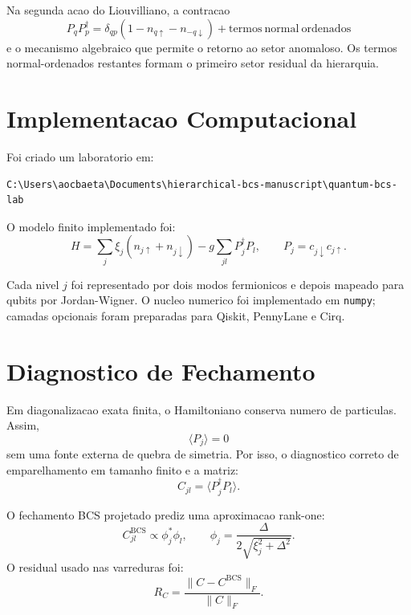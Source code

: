 \documentclass[11pt,a4paper]{article}
\begin{document}
Na segunda acao do Liouvilliano, a contracao
\begin{equation}
P_qP_p^\dagger
=\delta_{qp}(1-n_{q\uparrow}-n_{-q\downarrow})
+\mathrm{termos\ normal\ ordenados}
\end{equation}
e o mecanismo algebraico que permite o retorno ao setor anomaloso. Os termos normal-ordenados restantes formam o primeiro setor residual da hierarquia.

\section{Implementacao Computacional}

Foi criado um laboratorio em:
\begin{verbatim}
C:\Users\aocbaeta\Documents\hierarchical-bcs-manuscript\quantum-bcs-lab
\end{verbatim}

O modelo finito implementado foi:
\begin{equation}
H=\sum_j\xi_j(n_{j\uparrow}+n_{j\downarrow})
-g\sum_{jl}P_j^\dagger P_l,
\qquad
P_j=c_{j\downarrow}c_{j\uparrow}.
\end{equation}

Cada nivel \(j\) foi representado por dois modos fermionicos e depois mapeado para qubits por Jordan-Wigner. O nucleo numerico foi implementado em \texttt{numpy}; camadas opcionais foram preparadas para Qiskit, PennyLane e Cirq.

\section{Diagnostico de Fechamento}

Em diagonalizacao exata finita, o Hamiltoniano conserva numero de particulas. Assim,
\begin{equation}
\langle P_j\rangle=0
\end{equation}
sem uma fonte externa de quebra de simetria. Por isso, o diagnostico correto de emparelhamento em tamanho finito e a matriz:
\begin{equation}
C_{jl}=\langle P_j^\dagger P_l\rangle .
\end{equation}

O fechamento BCS projetado prediz uma aproximacao rank-one:
\begin{equation}
C^{\mathrm{BCS}}_{jl}\propto \phi_j^\ast\phi_l,
\qquad
\phi_j=\frac{\Delta}{2\sqrt{\xi_j^2+\Delta^2}}.
\end{equation}
O residual usado nas varreduras foi:
\begin{equation}
R_C=
\frac{\|C-C^{\mathrm{BCS}}\|_F}{\|C\|_F}.
\end{equation}
\end{document}
